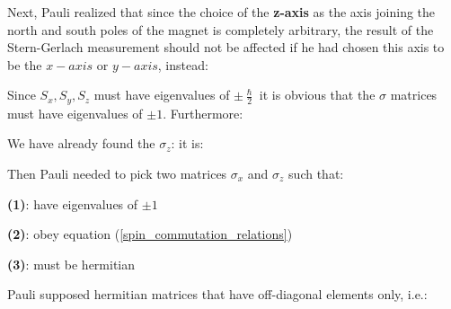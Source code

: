 \documentclass{article}
\begin{document}

Next, Pauli realized that since the choice of the \textbf{z-axis} as the axis joining the north and south poles of the magnet is completely arbitrary, the result of the Stern-Gerlach measurement should not be affected if he had chosen this axis to be the $x-axis$ or $y-axis$, instead:


Since $S_x, S_y, S_z$ must have eigenvalues of $\pm \frac{\hslash}{2}$ it is obvious that the $\sigma$ matrices must have eigenvalues of $\pm 1$. Furthermore:


We have already found the $\sigma_z$: it is:


Then Pauli needed to pick two matrices $\sigma_x$ and $\sigma_z$ such that:

\textbf{(1)}: have eigenvalues of $\pm 1$

\textbf{(2)}: obey equation (\ref{spin_commutation_relations})

\textbf{(3)}: must be hermitian


Pauli supposed hermitian matrices that have off-diagonal elements only, i.e.:

\end{document}
